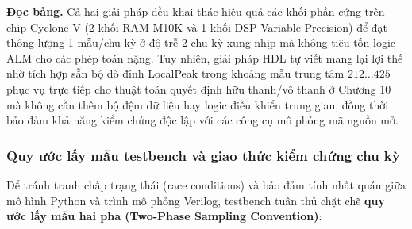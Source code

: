 \textbf{Đọc bảng.} Cả hai giải pháp đều khai thác hiệu quả các khối phần cứng trên chip Cyclone V (2 khối RAM M10K và 1 khối DSP Variable Precision) để đạt thông lượng 1 mẫu/chu kỳ ở độ trễ 2 chu kỳ xung nhịp mà không tiêu tốn logic ALM cho các phép toán nặng. Tuy nhiên, giải pháp HDL tự viết  mang lại lợi thế nhờ tích hợp sẵn bộ dò đỉnh LocalPeak trong khoảng mẫu trung tâm $212 \dots 425$ phục vụ trực tiếp cho thuật toán quyết định hữu thanh/vô thanh ở Chương 10 mà không cần thêm bộ đệm dữ liệu hay logic điều khiển trung gian, đồng thời bảo đảm khả năng kiểm chứng độc lập với các công cụ mô phỏng mã nguồn mở.

\subsubsection*{Quy ước lấy mẫu testbench và giao thức kiểm chứng chu kỳ}
Để tránh tranh chấp trạng thái (race conditions) và bảo đảm tính nhất quán giữa mô hình Python và trình mô phỏng Verilog, testbench  tuân thủ chặt chẽ \textbf{quy ước lấy mẫu hai pha (Two-Phase Sampling Convention)}:
